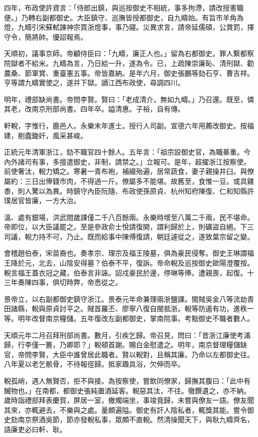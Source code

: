 \begin{pinyinscope}
四年，布政使許資言：「侍郎出鎮，與巡按御史不相統，事多拘滯，請改授憲職便。」乃轉右副都御史。大臣鎮守、巡撫皆授都御史，自九疇始。有旨市羊角為燈，九疇引宋蘇軾諫神宗買浙燈事，事乃寢。災異求言，請帝延儒碩，公賞罰，擇守令，簡將帥。優詔報焉。

天順初，議事京師。帝顧侍臣曰：「九疇，廉正人也。」留為右都御史。罪人繫都察院獄者不給米。九疇為言，乃日給一升，遂為令。已，上疏陳崇廉恥、清刑獄、勸農桑、節軍賞、重臺憲五事。帝皆嘉納。是年六月，御史張鵬等劾石亨、曹吉祥。亨等謂九疇實使之，遂并下獄。謫江西布政使，尋調四川。

明年，禮部缺尚書。帝問李賢。賢曰：「老成清介，無如九疇。」乃召還。既至，憐其老，改南京刑部尚書。四年卒。謚清惠。子裕，自有傳。

軒輗，字惟行，鹿邑人。永樂末年進士。授行人司副。宣德六年用薦改御史。按福建，剔蠹鋤奸，風采甚峻。

正統元年清軍浙江，劾不職官四十餘人。五年言：「祖宗設御史官，為職綦重。今內外諸司有事，多擅遣御史，非制，請禁之。」立報可。是年，超擢浙江按察使。前使奢汰，輗力矯之。寒暑一青布袍，補綴殆遍，居常蔬食，妻子親操井臼。與僚屬約：三日出俸錢市肉，不得過一斤。僚屬多不能堪。故舊至，食惟一豆。或具雞黍，則人驚以為異。時鎮守內臣阮隨、布政使孫原貞、杭州知府陳復、仁和知縣許璞居官皆廉，一方大治。

溫、處有銀場，洪武間歲課僅二千八百餘兩。永樂時增至八萬二千兩，民不堪命。帝即位，以大臣議罷之。至是參政俞士悅請復開，謂利歸於上，則礦盜自絕。下三司議，輗力持不可，乃止。既而給事中陳傅復請，朝廷遽從之，遂致葉宗留之變。

會稽趙伯泰，宋苗裔也。奏孝宗、理宗及福王陵墓，俱為豪民侵奪。御史王琳謂福王降於元，北去，山陰安得墓？伯泰不平，復訴。帝命輗及巡按御史歐陽澄覆按。輗言福王蓋衣冠之藏，伯泰言非誣。詔戍豪民於邊，停琳等俸。遭親喪，起復。十三年奏陳四事，俱切時弊，帝悉從之。

景帝立，以右副都御史鎮守浙江。景泰元年命兼理兩浙鹽課。閩賊吳金八等流劫青田諸縣，輗與原貞討平之。賊首羅丕、廖寧八復自閩抵浙。輗等防遏有功，進秩一等。明年改督南京糧儲。五年復改左副都御史，掌南院事。考黜御史不職者數人。

天順元年二月召拜刑部尚書。數月，引疾乞歸。帝召見，問曰：「昔浙江廉使考滿歸，行李僅一簏，乃卿耶？」輗頓首謝。賜白金慰遣之。明年，南京督理糧儲缺官，帝問李賢，大臣中誰曾居此職者。賢以輗對，且稱其廉。乃命以左都御史往。八年夏以老乞骸骨，不待報徑歸。抵家趣具浴，欠伸而卒。

輗孤峭，遇人無賢否，拒不與接。為按察使，嘗飲同僚家，歸撫其腹曰：「此中有贓物也。」在南都，都御史張純置酒延客。輗惡其汰，不往。徹饌遺之，亦不納。歲時詣禮部拜表慶賀，屏居一室，撤燭端坐，事竣竟歸，未嘗與僚友一語。僚友聞其來，亦輒避去，不樂與之處。量頗遍隘。御史有訐人陰私者，輒獎其能。嘗令御史劾南京祭酒吳節，節亦發輗私事，眾頗不直輗。然清操聞天下，與耿九疇齊名，語廉吏必曰軒、耿。


\end{pinyinscope}
